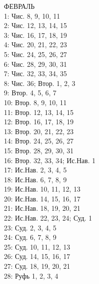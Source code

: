 \documentclass[fontsize=16pt,letterpaper,DIV=6]{scrartcl}
\begin{document}
\begin{multicols}{2}
ФЕВРАЛЬ
\\  1: Чис. 8, 9, 10, 11
\\  2: Чис. 12, 13, 14, 15
\\  3: Чис. 16, 17, 18, 19
\\  4: Чис. 20, 21, 22, 23
\\  5: Чис. 24, 25, 26, 27
\\  6: Чис. 28, 29, 30, 31
\\  7: Чис. 32, 33, 34, 35
\\  8: Чис. 36; Втор. 1, 2, 3
\\  9: Втор. 4, 5, 6, 7
\\  10: Втор. 8, 9, 10, 11
\\  11: Втор. 12, 13, 14, 15 
\\  12: Втор. 16, 17, 18, 19 
\\  13: Втор. 20, 21, 22, 23 
\\  14: Втор. 24, 25, 26, 27
\\  15: Втор. 28, 29, 30, 31
\\  16: Втор. 32, 33, 34; Ис.Нав. 1
\\  17: Ис.Нав. 2, 3, 4, 5
\\  18: Ис.Нав. 6, 7, 8, 9
\\  19: Ис.Нав. 10, 11, 12, 13
\\  20: Ис.Нав. 14, 15, 16, 17
\\  21: Ис.Нав. 18, 19, 20, 21
\\  22: Ис.Нав. 22, 23, 24; Суд. 1
\\  23: Суд. 2, 3, 4, 5
\\  24: Суд. 6, 7, 8, 9
\\  25: Суд. 10, 11, 12, 13
\\  26: Суд. 14, 15, 16, 17
\\  27: Суд. 18, 19, 20, 21
\\  28: Руфь 1, 2, 3, 4
\\
\\
\end{multicols}
\clearpage
\end{document}
